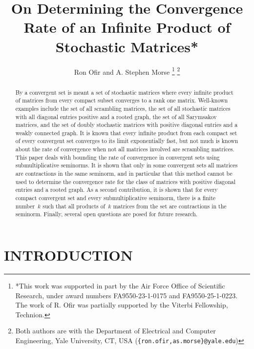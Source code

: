 \documentclass[letterpaper, 10 pt, conference]{ieeeconf}  %
\title{\LARGE \bf
On Determining the Convergence Rate of an Infinite Product of Stochastic Matrices*
}
\author{Ron Ofir and A. Stephen Morse%
\thanks{*This work was supported in part by the Air Force Office of Scientific Research, under award numbers FA9550-23-1-0175 and FA9550-25-1-0223. The work of R. Ofir was partially supported by the Viterbi Fellowship, Technion.}%
\thanks{Both authors are with the Department of Electrical and Computer Engineering, Yale University, CT, USA ({\tt\small \{ron.ofir,as.morse\}@yale.edu})}%
}
\begin{document}
\maketitle
\thispagestyle{empty}
\pagestyle{empty}


\begin{abstract} 

By a convergent set is meant a set of stochastic matrices where every infinite product of matrices from every compact subset converges to a rank one matrix. Well-known examples include the set of all scrambling matrices, the set of all stochastic matrices with all diagonal entries positive and a rooted graph, the set of all Sarymsakov matrices, and the set of doubly stochastic matrices with positive diagonal entries and a weakly connected graph. It is known that every infinite product from each compact set of every convergent set converges to its limit exponentially fast, but not much is known about the rate of convergence when not all matrices involved are scrambling matrices.
This paper deals with bounding the rate of convergence in convergent sets using submultiplicative seminorms. It is shown that only in some convergent sets all matrices are contractions in the same seminorm, and in particular that this method cannot be used to determine the convergence rate for the class of matrices with positive diagonal entries and a rooted graph. As a second contribution, it is shown that for every compact convergent set and every submultiplicative seminorm, there is a finite number~$k$ such that all products of~$k$ matrices from the set are contractions in the seminorm. Finally, several open questions are posed for future research.

\end{abstract}



\section{INTRODUCTION}
\end{document}
